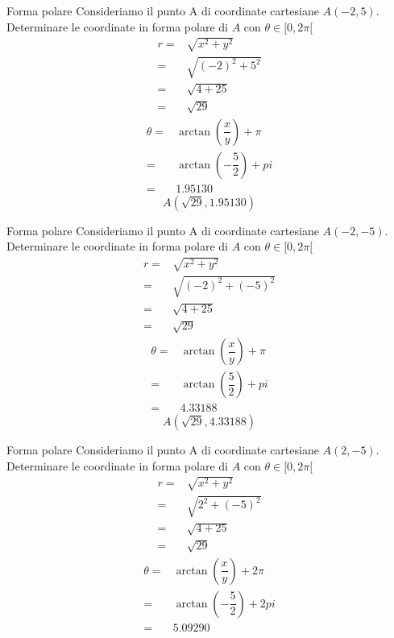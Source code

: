 \begin{esempiot}{Forma polare}{} Consideriamo il punto A di coordinate cartesiane $A(-2,5)$. Determinare le coordinate in forma polare di $A$ con $\theta\in[0,2\pi[$
	\begin{align*}
	r=&\sqrt{x^2+y^2}\\
	=&\sqrt{(-2)^2+5^2}\\
	=&\sqrt{4+25}\\
	=&\sqrt{29}
	\end{align*}
	\begin{align*}
	\theta=&\arctan\left(\dfrac{x}{y}\right)+\pi\\
	=&\arctan\left(-\dfrac{5}{2}\right)+pi\\
	=&1.95130
	\end{align*}
	\[A(\sqrt{29},1.95130) \]
\end{esempiot}
\begin{esempiot}{Forma polare}{} Consideriamo il punto A di coordinate cartesiane $A(-2,-5)$. Determinare le coordinate in forma polare di $A$ con $\theta\in[0,2\pi[$
	\begin{align*}
	r=&\sqrt{x^2+y^2}\\
	=&\sqrt{(-2)^2+(-5)^2}\\
	=&\sqrt{4+25}\\
	=&\sqrt{29}
	\end{align*}
	\begin{align*}
	\theta=&\arctan\left(\dfrac{x}{y}\right)+\pi\\
	=&\arctan\left(\dfrac{5}{2}\right)+pi\\
	=&4.33188
	\end{align*}
\[A(\sqrt{29},4.33188) \]
\end{esempiot}
\begin{esempiot}{Forma polare}{} Consideriamo il punto A di coordinate cartesiane $A(2,-5)$. Determinare le coordinate in forma polare di $A$ con $\theta\in[0,2\pi[$
	\begin{align*}
	r=&\sqrt{x^2+y^2}\\
	=&\sqrt{2^2+(-5)^2}\\
	=&\sqrt{4+25}\\
	=&\sqrt{29}
	\end{align*}
	\begin{align*}
	\theta=&\arctan\left(\dfrac{x}{y}\right)+2\pi\\
	=&\arctan\left(-\dfrac{5}{2}\right)+2pi\\
	=&5.09290
	\end{align*}
\end{esempiot}
